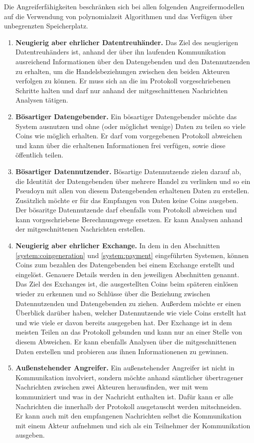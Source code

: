 \documentclass{scrreprt}
\begin{document}
Die Angreiferfähigkeiten beschränken sich bei allen folgenden Angreifermodellen auf die Verwendung von polynomialzeit Algorithmen und das Verfügen über unbegrenzten Speicherplatz.
\begin{enumerate}
    \item \textbf{Neugierig aber ehrlicher Datentreuhänder.} Das Ziel des neugierigen Datentreuhänders ist, anhand der über ihn laufenden Kommunikation ausreichend Informationen über den Datengebenden und den Datennutzenden zu erhalten, um die Handelsbeziehungen zwischen den beiden Akteuren verfolgen zu können. Er muss sich an die im Protokoll vorgeschriebenen Schritte halten und darf nur anhand der mitgeschnittenen Nachrichten Analysen tätigen.
    \item \textbf{Bösartiger Datengebender.} Ein bösartiger Datengebender möchte das System ausnutzen und ohne (oder möglichst wenige) Daten zu teilen so  viele Coins wie möglich erhalten. Er darf vom vorgegebenen Protokoll abweichen und kann über die erhaltenen Informationen frei verfügen, sowie diese öffentlich teilen.
    \item \textbf{Bösartiger Datennutzender.} Bösartige Datennutzende zielen darauf ab, die Identität der Datengebenden über mehrere Handel zu verlinken und so ein Pseudoyn mit allen von diesem Datengebenden erhaltenen Daten zu erstellen. Zusätzlich möchte er für das Empfangen von Daten keine Coins ausgeben. Der bösaritge Datennutzende darf ebenfalls vom Protokoll abweichen und kann vorgeschriebene Berechnungswege ersetzen. Er kann Analysen anhand der mitgeschnittenen Nachrichten erstellen.
    \item \textbf{Neugierig aber ehrlicher Exchange.} In dem in den Abschnitten \ref{system:coingeneration} und \ref{system:payment} eingeführten Systemen, können Coins zum bezahlen des Datengebenden bei einem Exchange erstellt und eingelöst. Genauere Details werden in den jeweiligen Abschnitten genannt. Das Ziel des Exchanges ist, die ausgestellten Coins beim späteren einlösen wieder zu erkennen und so Schlüsse über die Beziehung zwischen Datennutzenden und Datengebenden zu ziehen. Außerdem möchte er einen Überblick darüber haben, welcher Datennutzende wie viele Coins erstellt hat und wie viele er davon bereits ausgegeben hat. Der Exchange ist in dem meisten Teilen an das Protokoll gebunden und kann nur an einer Stelle von diesem Abweichen. Er kann ebenfalls Analysen über die mitgeschnittenen Daten erstellen und probieren aus ihnen Informationenen zu gewinnen.
    \item \textbf{Außenstehender Angreifer.} Ein außenstehender Angreifer ist nicht in Kommunikation involviert, sondern möchte anhand sämtlicher übertragener Nachrichten zwischen zwei Akteuren herausfinden, wer mit wem kommuniziert und was in der Nachricht enthalten ist. Dafür kann er alle Nachrichten die innerhalb der Protokoll ausgetauscht werden mitschneiden. Er kann auch mit den empfangenen Nachrichten selbst die Kommunikation mit einem Akteur aufnehmen und sich als ein Teilnehmer der Kommunikation ausgeben.
\end{enumerate}
\end{document}
